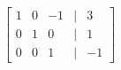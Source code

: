 \documentclass[preview]{standalone}
\begin{document}
\begin{align*}
\begin{bmatrix} 1 & 0 & -1 & | & 3 \\ 0 & 1 & 0 & | & 1 \\ 0 & 0 & 1 & | & -1 \end{bmatrix}
\end{align*}
\end{document}
